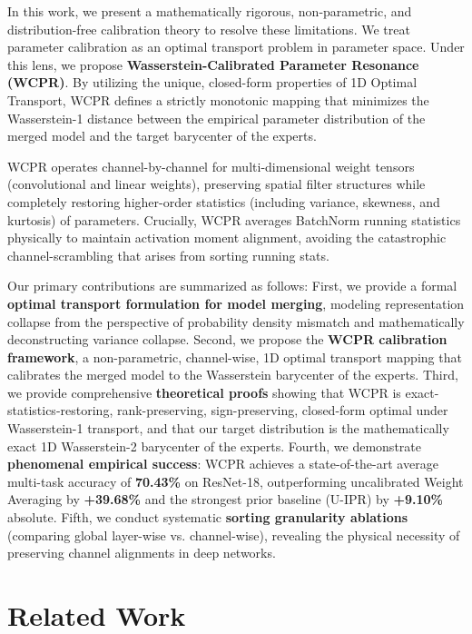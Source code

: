 \documentclass{article}
\theoremstyle{plain}
\theoremstyle{definition}
\theoremstyle{remark}
\begin{document}
In this work, we present a mathematically rigorous, non-parametric, and distribution-free calibration theory to resolve these limitations. We treat parameter calibration as an optimal transport problem in parameter space. Under this lens, we propose \textbf{Wasserstein-Calibrated Parameter Resonance (WCPR)}. By utilizing the unique, closed-form properties of 1D Optimal Transport, WCPR defines a strictly monotonic mapping that minimizes the Wasserstein-1 distance between the empirical parameter distribution of the merged model and the target barycenter of the experts.

WCPR operates channel-by-channel for multi-dimensional weight tensors (convolutional and linear weights), preserving spatial filter structures while completely restoring higher-order statistics (including variance, skewness, and kurtosis) of parameters. Crucially, WCPR averages BatchNorm running statistics physically to maintain activation moment alignment, avoiding the catastrophic channel-scrambling that arises from sorting running stats.

Our primary contributions are summarized as follows:
First, we provide a formal \textbf{optimal transport formulation for model merging}, modeling representation collapse from the perspective of probability density mismatch and mathematically deconstructing variance collapse.
Second, we propose the \textbf{WCPR calibration framework}, a non-parametric, channel-wise, 1D optimal transport mapping that calibrates the merged model to the Wasserstein barycenter of the experts.
Third, we provide comprehensive \textbf{theoretical proofs} showing that WCPR is exact-statistics-restoring, rank-preserving, sign-preserving, closed-form optimal under Wasserstein-1 transport, and that our target distribution is the mathematically exact 1D Wasserstein-2 barycenter of the experts.
Fourth, we demonstrate \textbf{phenomenal empirical success}: WCPR achieves a state-of-the-art average multi-task accuracy of \textbf{70.43\%} on ResNet-18, outperforming uncalibrated Weight Averaging by \textbf{+39.68\%} and the strongest prior baseline (U-IPR) by \textbf{+9.10\%} absolute.
Fifth, we conduct systematic \textbf{sorting granularity ablations} (comparing global layer-wise vs. channel-wise), revealing the physical necessity of preserving channel alignments in deep networks.

\section{Related Work}
\label{sec:related}
\end{document}
